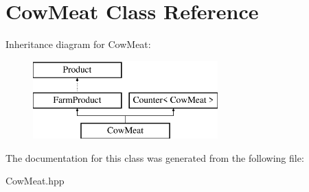 \hypertarget{class_cow_meat}{}\section{Cow\+Meat Class Reference}
\label{class_cow_meat}
Inheritance diagram for Cow\+Meat\+:\begin{figure}[H]
\begin{center}
\leavevmode
\includegraphics[height=3.000000cm]{class_cow_meat}
\end{center}
\end{figure}


The documentation for this class was generated from the following file\+:\begin{DoxyCompactItemize}
\item 
Cow\+Meat.\+hpp\end{DoxyCompactItemize}
